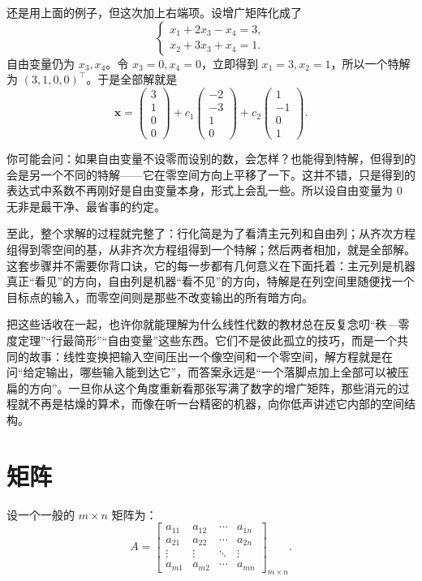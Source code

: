 \documentclass[UTF8]{ctexbook}
\begin{document}
还是用上面的例子，但这次加上右端项。设增广矩阵化成了
\[
\begin{cases}
x_1 + 2x_3 - x_4 = 3,\\
x_2 + 3x_3 + x_4 = 1.
\end{cases}
\]
自由变量仍为 $x_3,x_4$。令 $x_3=0,x_4=0$，立即得到 $x_1=3,x_2=1$，所以一个特解为 $(3,1,0,0)^\top$。于是全部解就是
\[
\mathbf{x}= \begin{pmatrix}3\\1\\0\\0\end{pmatrix} + c_1\begin{pmatrix}-2\\-3\\1\\0\end{pmatrix} + c_2\begin{pmatrix}1\\-1\\0\\1\end{pmatrix}.
\]

你可能会问：如果自由变量不设零而设别的数，会怎样？也能得到特解，但得到的会是另一个不同的特解——它在零空间方向上平移了一下。这并不错，只是得到的表达式中系数不再刚好是自由变量本身，形式上会乱一些。所以设自由变量为 $0$ 无非是最干净、最省事的约定。

至此，整个求解的过程就完整了：行化简是为了看清主元列和自由列；从齐次方程组得到零空间的基，从非齐次方程组得到一个特解；然后两者相加，就是全部解。这套步骤并不需要你背口诀，它的每一步都有几何意义在下面托着：主元列是机器真正“看见”的方向，自由列是机器“看不见”的方向，特解是在列空间里随便找一个目标点的输入，而零空间则是那些不改变输出的所有暗方向。

把这些话收在一起，也许你就能理解为什么线性代数的教材总在反复念叨“秩—零度定理”“行最简形”“自由变量”这些东西。它们不是彼此孤立的技巧，而是一个共同的故事：线性变换把输入空间压出一个像空间和一个零空间，解方程就是在问“给定输出，哪些输入能到达它”，而答案永远是“一个落脚点加上全部可以被压扁的方向”。一旦你从这个角度重新看那张写满了数字的增广矩阵，那些消元的过程就不再是枯燥的算术，而像在听一台精密的机器，向你低声讲述它内部的空间结构。

\newpage

\section{矩阵}

设一个一般的 $m	\times n$ 矩阵为：
\[
A=\begin{bmatrix}
a_{11} & a_{12} & \cdots & a_{1n}\\
a_{21} & a_{22} & \cdots & a_{2n}\\
\vdots & \vdots & \ddots & \vdots\\
a_{m1} & a_{m2} & \cdots & a_{mn}
\end{bmatrix}_{m\times n}.
\]
\end{document}
